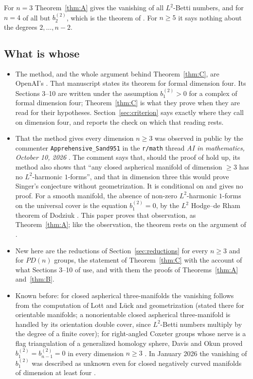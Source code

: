 \documentclass[11pt,a4paper]{article}
\theoremstyle{definition}
\theoremstyle{remark}
\newcommand{\bt}[1]{b^{(2)}_{#1}}
\begin{document}
For $n=3$ Theorem~\ref{thm:A} gives the vanishing of all $L^2$-Betti numbers, and
for $n=4$ of all but $\bt{2}$, which is the theorem of \cite{O}. For $n\ge5$ it says
nothing about the degrees $2,\dots,n-2$.

\subsection{What is whose}\label{sub:whose}
\begin{itemize}
\item The method, and the whole argument behind Theorem~\ref{thm:C}, are OpenAI's
\cite{O}. That manuscript states its theorem for formal dimension four. Its
Sections 3--10 are written under the assumption $\bt{1}>0$ for a complex of formal
dimension four; Theorem~\ref{thm:C} is what they prove when they are read for their
hypotheses. Section~\ref{sec:criterion} says exactly where they call on dimension
four, and reports the check on which that reading rests.
\item That the method gives every dimension $n\ge3$ was observed in public by
the commenter \texttt{Apprehensive\_Sand951} in the \texttt{r/math} thread
\emph{AI in mathematics, October 10, 2026} \cite{R}. The comment says that,
should the proof of \cite{O} hold up, its method also shows that ``any closed
aspherical manifold of dimension $\ge3$ has no $L^2$-harmonic $1$-forms'', and
that in dimension three this would prove Singer's conjecture without
geometrization. It is conditional on \cite{O} and gives no proof. For a smooth
manifold, the absence of non-zero $L^2$-harmonic $1$-forms on the universal
cover is the equation $\bt{1}=0$, by the $L^2$ Hodge--de Rham theorem of Dodziuk
\cite[Chapter~1]{L}. This paper proves that observation, as
Theorem~\ref{thm:A}; like the observation, the theorem rests on the argument of
\cite{O}.
\item New here are the reductions of Section~\ref{sec:reductions} for every
$n\ge3$ and for $PD(n)$ groups, the statement of Theorem~\ref{thm:C} with the
account of what Sections 3--10 of \cite{O} use, and with them the proofs of Theorems~\ref{thm:A}
and~\ref{thm:B}.
\item Known before: for closed aspherical three-manifolds the vanishing follows
from the computation of Lott and L\"uck \cite[Theorem~0.1]{LL} and geometrization (stated there for
orientable manifolds; a nonorientable closed aspherical three-manifold is
handled by its orientation double cover, since $L^2$-Betti numbers multiply by
the degree of a finite cover);
for right-angled Coxeter groups whose nerve is a flag triangulation of a
generalized homology sphere, Davis and Okun proved $\bt{1}=\bt{n-1}=0$ in every
dimension $n\ge3$ \cite[Theorem~11.3.2]{DO}. In January 2026 the vanishing of
$\bt{1}$ was described as unknown even for closed negatively curved manifolds of
dimension at least four \cite{DHT}.
\end{itemize}
\end{document}
